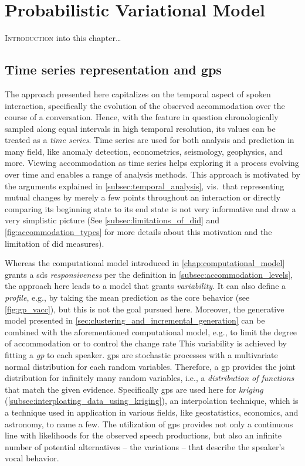 \chapter{Probabilistic Variational Model}
\label{chap:statistical_model}

\lettrine{I}{ntroduction} into this chapter\dots

\pagebreak

\section{Time series representation and \aclp{gp}}
\label{sec:time_series_analysis}

The approach presented here capitalizes on the temporal aspect of spoken interaction, specifically the evolution of the observed accommodation over the course of a conversation.
Hence, with the feature in question chronologically sampled along equal intervals in high temporal resolution, its values can be treated as a \emph{time series}.
Time series are used for both analysis and prediction in many field, like anomaly detection, econometrics, seismology, geophysics, and more.
Viewing accommodation as time series helps exploring it a process evolving over time and enables a range of analysis methods.
This approach is motivated by the arguments explained in \cref{subsec:temporal_analysis}, vis.\ that representing mutual changes by merely a few points throughout an interaction or directly comparing its beginning state to its end state is not very informative and draw a very simplistic picture (See \cref{subsec:limitations_of_did} and \cref{fig:accommodation_types} for more details about this motivation and the limitation of \ac{did} measures).

Whereas the computational model introduced in \cref{chap:computational_model} grants a \ac{sds} \emph{responsiveness} per the definition in \cref{subsec:accommodation_levels}, the approach here leads to a model that grants \emph{variability}.
It can also define a \emph{profile}, e.g., by taking the mean prediction as the core behavior (see \cref{fig:gp_vacc}), but this is not the goal pursued here.
Moreover, the generative model presented in \cref{sec:clustering_and_incremental_generation} can be combined with the aforementioned computational model, e.g., to limit the degree of accommodation or to control the change rate
This variability is achieved by fitting a \emph{\ac{gp}} to each speaker.
\Acp{gp} are stochastic processes with a multivariate normal distribution for each random variables.
Therefore, a \ac{gp} provides the joint distribution for infinitely many random variables, i.e., a \emph{distribution of functions} that match the given evidence.
Specifically \acp{gp} are used here for \emph{kriging} (\cref{subsec:interploating_data_using_kriging}), an interpolation technique, which is a technique used in application in various fields, like geostatistics, economics, and astronomy, to name a few.
The utilization of \acp{gp} provides not only a continuous line with likelihoods for the observed speech productions, but also an infinite number of potential alternatives -- the variations -- that describe the speaker's vocal behavior.

